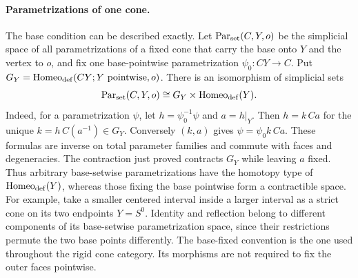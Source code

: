 \documentclass[11pt,a4paper]{article}
\theoremstyle{definition}
\begin{document}
\paragraph{Parametrizations of one cone.}\label{result-cone-parametrizations}
The base condition can be described exactly. Let
$\operatorname{Par}_{\rm set}(C,Y,o)$ be the simplicial space of all
parametrizations of a fixed cone that carry the base onto $Y$ and the
vertex to $o$, and fix one base-pointwise parametrization
$\psi_0:CY\to C$. Put
$G_Y=\operatorname{Homeo}_{\rm def}(CY;Y\text{ pointwise},o)$.
There is an isomorphism of simplicial sets
\[
 \operatorname{Par}_{\rm set}(C,Y,o)
 \cong G_Y\times\operatorname{Homeo}_{\rm def}(Y).
\]
Indeed, for a parametrization $\psi$, let
$h=\psi_0^{-1}\psi$ and $a=h|_Y$. Then
$h=k\,Ca$ for the unique $k=h\,C(a^{-1})\in G_Y$.
Conversely $(k,a)$ gives $\psi=\psi_0k\,Ca$.
These formulas are inverse on total parameter families and commute
with faces and degeneracies. The contraction just proved contracts
$G_Y$ while leaving $a$ fixed. Thus arbitrary base-setwise
parametrizations have the homotopy type of
$\operatorname{Homeo}_{\rm def}(Y)$, whereas those fixing the base
pointwise form a contractible space.
For example, take a smaller centered interval inside a larger interval
as a strict cone on its two endpoints $Y=S^0$. Identity and reflection
belong to different components of its base-setwise parametrization
space, since their restrictions permute the two base points
 differently. The base-fixed convention is the one used throughout
the rigid cone category. Its morphisms are not required to fix the
outer faces pointwise.
\end{document}

